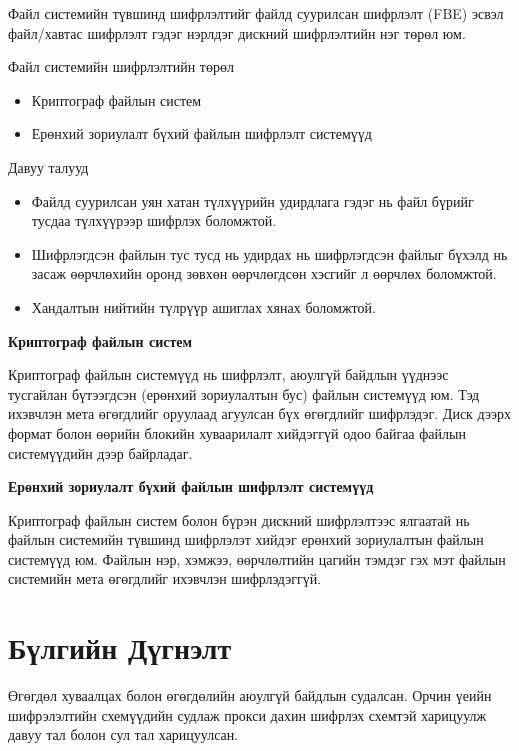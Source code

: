 Файл системийн түвшинд шифрлэлтийг файлд суурилсан шифрлэлт (FBE) эсвэл файл/хавтас шифрлэлт гэдэг нэрлдэг дискний шифрлэлтийн нэг төрөл юм.

Файл системийн шифрлэлтийн төрөл
\begin{itemize}
    \item Криптограф файлын систем
    \item Ерөнхий зориулалт бүхий файлын шифрлэлт системүүд
\end{itemize}

Давуу талууд
\begin{itemize}
    \item Файлд суурилсан уян хатан түлхүүрийн удирдлага гэдэг нь файл бүрийг тусдаа түлхүүрээр шифрлэх боломжтой.
    \item Шифрлэгдсэн файлын тус тусд нь удирдах нь шифрлэгдсэн файлыг бүхэлд нь засаж өөрчлөхийн оронд зөвхөн өөрчлөгдсөн хэсгийг л өөрчлөх боломжтой.
    \item Хандалтын нийтийн түлрүүр ашиглах хянах боломжтой.
\end{itemize}

\textbf{Криптограф файлын систем}

Криптограф файлын системүүд нь шифрлэлт, аюулгүй байдлын үүднээс тусгайлан бүтээгдсэн (ерөнхий зориулалтын бус) файлын системүүд юм. Тэд ихэвчлэн мета өгөгдлийг оруулаад агуулсан бүх өгөгдлийг шифрлэдэг. Диск дээрх формат болон өөрийн блокийн хуваарилалт хийдэггүй одоо байгаа файлын системүүдийн дээр байрладаг.

\textbf{Ерөнхий зориулалт бүхий файлын шифрлэлт системүүд}

Криптограф файлын систем болон бүрэн дискний шифрлэлтээс ялгаатай нь файлын системийн түвшинд шифрлэлэт хийдэг ерөнхий зориулалтын файлын системүүд юм. Файлын нэр, хэмжээ, өөрчлөлтийн цагийн тэмдэг гэх мэт файлын системийн мета өгөгдлийг ихэвчлэн шифрлэдэггүй.


\section{Бүлгийн Дүгнэлт}

Өгөгдөл хуваалцах болон өгөгдөлийн аюулгүй байдлын судалсан. Орчин үеийн шифрэлэлтийн схемүүдийн судлаж прокси дахин шифрлэх схемтэй харицуулж давуу тал болон сул тал харицуулсан.
